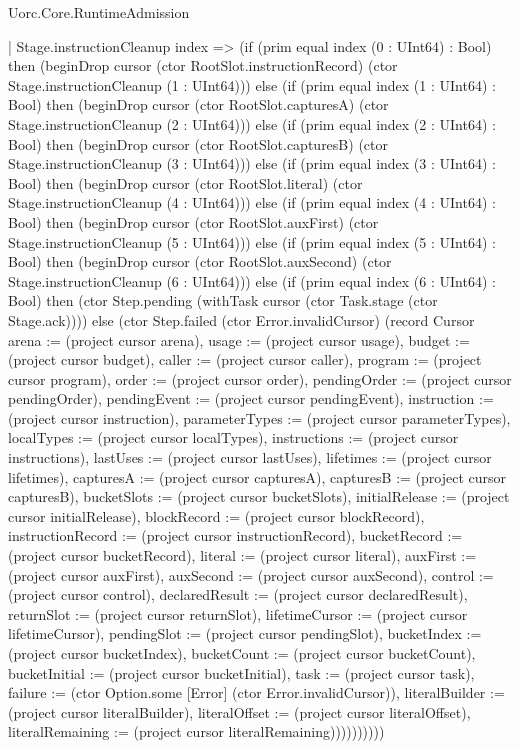 \begin{lexlean}{Uorc.Core.RuntimeAdmission}
\begin{semanticmodule}
{      | Stage.instructionCleanup index => (if (prim equal index (0 : UInt64) : Bool) then (beginDrop cursor (ctor RootSlot.instructionRecord) (ctor Stage.instructionCleanup (1 : UInt64))) else (if (prim equal index (1 : UInt64) : Bool) then (beginDrop cursor (ctor RootSlot.capturesA) (ctor Stage.instructionCleanup (2 : UInt64))) else (if (prim equal index (2 : UInt64) : Bool) then (beginDrop cursor (ctor RootSlot.capturesB) (ctor Stage.instructionCleanup (3 : UInt64))) else (if (prim equal index (3 : UInt64) : Bool) then (beginDrop cursor (ctor RootSlot.literal) (ctor Stage.instructionCleanup (4 : UInt64))) else (if (prim equal index (4 : UInt64) : Bool) then (beginDrop cursor (ctor RootSlot.auxFirst) (ctor Stage.instructionCleanup (5 : UInt64))) else (if (prim equal index (5 : UInt64) : Bool) then (beginDrop cursor (ctor RootSlot.auxSecond) (ctor Stage.instructionCleanup (6 : UInt64))) else (if (prim equal index (6 : UInt64) : Bool) then (ctor Step.pending (withTask cursor (ctor Task.stage (ctor Stage.ack)))) else (ctor Step.failed (ctor Error.invalidCursor) (record Cursor {arena := (project cursor arena), usage := (project cursor usage), budget := (project cursor budget), caller := (project cursor caller), program := (project cursor program), order := (project cursor order), pendingOrder := (project cursor pendingOrder), pendingEvent := (project cursor pendingEvent), instruction := (project cursor instruction), parameterTypes := (project cursor parameterTypes), localTypes := (project cursor localTypes), instructions := (project cursor instructions), lastUses := (project cursor lastUses), lifetimes := (project cursor lifetimes), capturesA := (project cursor capturesA), capturesB := (project cursor capturesB), bucketSlots := (project cursor bucketSlots), initialRelease := (project cursor initialRelease), blockRecord := (project cursor blockRecord), instructionRecord := (project cursor instructionRecord), bucketRecord := (project cursor bucketRecord), literal := (project cursor literal), auxFirst := (project cursor auxFirst), auxSecond := (project cursor auxSecond), control := (project cursor control), declaredResult := (project cursor declaredResult), returnSlot := (project cursor returnSlot), lifetimeCursor := (project cursor lifetimeCursor), pendingSlot := (project cursor pendingSlot), bucketIndex := (project cursor bucketIndex), bucketCount := (project cursor bucketCount), bucketInitial := (project cursor bucketInitial), task := (project cursor task), failure := (ctor Option.some [Error] (ctor Error.invalidCursor)), literalBuilder := (project cursor literalBuilder), literalOffset := (project cursor literalOffset), literalRemaining := (project cursor literalRemaining)})))))))))
}
\end{semanticmodule}
\end{lexlean}
